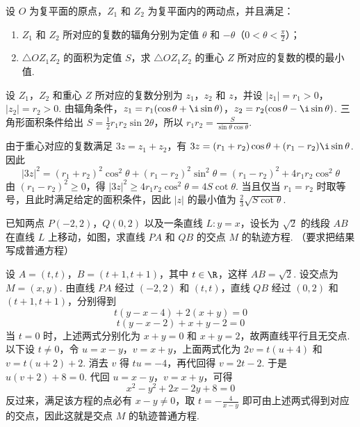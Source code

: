 \documentclass[UTF8,a4paper,oneside,11pt]{ctexbook}
\begin{document}
\begin{problem}

设 \(O\) 为复平面的原点，\(Z_{1}\) 和 \(Z_{2}\) 为复平面内的两动点，并且满足：

\begin{enumerate}
\item \(Z_{1}\) 和 \(Z_{2}\) 所对应的复数的辐角分别为定值 \(\theta\) 和 \(-\theta\)（\(0<\theta<\frac{\pi}{2}\)）；
\item \(\triangle OZ_{1}Z_{2}\) 的面积为定值 \(S\)，求 \(\triangle OZ_{1}Z_{2}\) 的重心 \(Z\) 所对应的复数的模的最小值.
\end{enumerate}

\begin{solution}
设 \(Z_1\)，\(Z_2\) 和重心 \(Z\) 所对应的复数分别为 \(z_1\)，\(z_2\) 和 \(z\)，并设 \(|z_1|=r_1>0\)，\(|z_2|=r_2>0\). 由辐角条件，\(z_1=r_1(\cos\theta+\i\sin\theta)\)，\(z_2=r_2(\cos\theta-\i\sin\theta)\). 三角形面积条件给出 \(S=\frac{1}{2}r_1r_2\sin 2\theta\)，所以 \(r_1r_2=\frac{S}{\sin\theta\cos\theta}\).

由于重心对应的复数满足 \(3z=z_1+z_2\)，有 \(3z=(r_1+r_2)\cos\theta+(r_1-r_2)\i\sin\theta\). 因此
\[
|3z|^2=(r_1+r_2)^2\cos^2\theta+(r_1-r_2)^2\sin^2\theta=(r_1-r_2)^2+4r_1r_2\cos^2\theta
\]
由 \((r_1-r_2)^2\geqslant0\)，得 \(|3z|^2\geqslant4r_1r_2\cos^2\theta=4S\cot\theta\). 当且仅当 \(r_1=r_2\) 时取等号，且此时满足给定的面积条件，因此 \(|z|\) 的最小值为 \(\frac{2}{3}\sqrt{S\cot\theta}\).
\end{solution}
\end{problem}

\begin{problem}

已知两点 \(P\left(-2,2\right)\)，\(Q\left(0,2\right)\) 以及一条直线 \(L:y=x\)，设长为 \(\sqrt{2}\) 的线段 \(AB\) 在直线 \(L\) 上移动，如图，求直线 \(PA\) 和 \(QB\) 的交点 \(M\) 的轨迹方程. （要求把结果写成普通方程）


\begin{solution}
设 \(A=(t,t)\)，\(B=(t+1,t+1)\)，其中 \(t\in\R\)，这样 \(AB=\sqrt{2}\). 设交点为 \(M=(x,y)\). 由直线 \(PA\) 经过 \((-2,2)\) 和 \((t,t)\)，直线 \(QB\) 经过 \((0,2)\) 和 \((t+1,t+1)\)，分别得到
\[
t(y-x-4)+2(x+y)=0
\]
\[
t(y-x-2)+x+y-2=0
\]
当 \(t=0\) 时，上述两式分别化为 \(x+y=0\) 和 \(x+y=2\)，故两直线平行且无交点. 以下设 \(t\neq0\)，令 \(u=x-y\)，\(v=x+y\)，上面两式化为 \(2v=t(u+4)\) 和 \(v=t(u+2)+2\). 消去 \(v\) 得 \(tu=-4\)，再代回得 \(v=2t-2\). 于是 \(u(v+2)+8=0\). 代回 \(u=x-y\)，\(v=x+y\)，可得
\[
x^2-y^2+2x-2y+8=0
\]
反过来，满足该方程的点必有 \(x-y\neq0\)，取 \(t=-\frac{4}{x-y}\) 即可由上述两式得到对应的交点，因此这就是交点 \(M\) 的轨迹普通方程.
\end{solution}
\end{problem}
\end{document}
